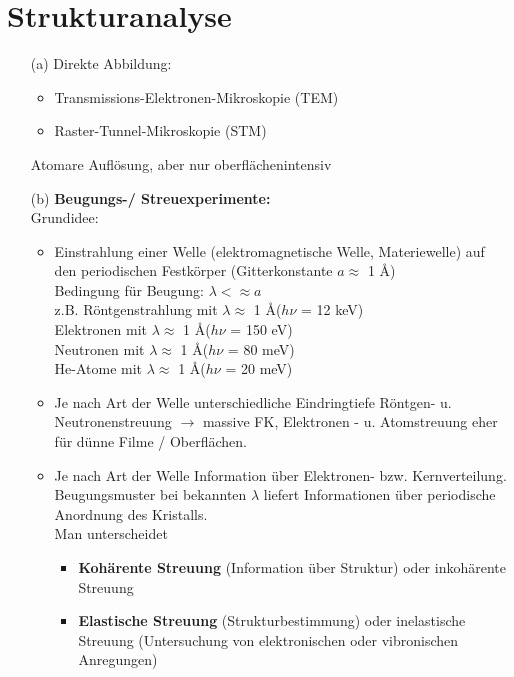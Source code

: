 \section{Strukturanalyse} \label{kap:3}
\begin{itemize}
    \item[(a)] Direkte Abbildung:\\
          \begin{itemize}
              \item Transmissions-Elektronen-Mikroskopie (TEM)
              \item Raster-Tunnel-Mikroskopie (STM)
          \end{itemize}
          Atomare Auflösung, aber nur oberflächenintensiv
    \item[(b)] \textbf{Beugungs-/ Streuexperimente:}\\
          Grundidee:
          \begin{itemize}
              \item Einstrahlung einer Welle (elektromagnetische Welle, Materiewelle) auf den periodischen Festkörper (Gitterkonstante $a \approx$ 1 \AA)\\
                    Bedingung für Beugung: $\lambda < \approx a$\\
                    z.B. Röntgenstrahlung mit $\lambda \approx$ 1 \AA ($h \nu$ = 12 keV)\\
                    Elektronen mit $\lambda \approx$ 1 \AA ($h \nu$ = 150 eV)\\
                    Neutronen mit $\lambda \approx$ 1 \AA ($h \nu$ = 80 meV)\\
                    He-Atome mit $\lambda \approx$ 1 \AA ($h \nu$ = 20 meV)
              \item Je nach Art der Welle unterschiedliche Eindringtiefe Röntgen- u. Neutronenstreuung $\rightarrow$ massive FK, Elektronen - u. Atomstreuung eher für dünne Filme / Oberflächen.
              \item Je nach Art der Welle Information über Elektronen- bzw. Kernverteilung. Beugungsmuster bei bekannten $\lambda$ liefert Informationen über periodische Anordnung des Kristalls.\\
                    Man unterscheidet
                    \begin{itemize}
                        \item \textbf{Kohärente Streuung} (Information über Struktur) oder inkohärente Streuung
                        \item \textbf{Elastische Streuung} (Strukturbestimmung) oder inelastische Streuung (Untersuchung von elektronischen oder vibronischen Anregungen)
                    \end{itemize}
          \end{itemize}
\end{itemize}





